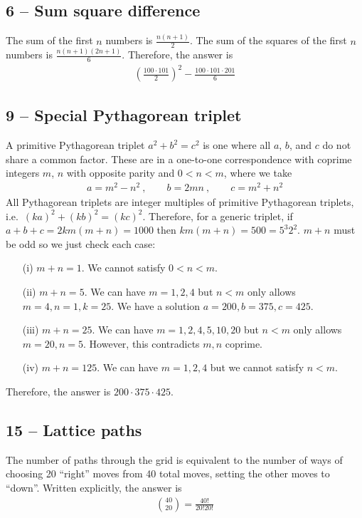 \documentclass{article}
\begin{document}
\subsection*{6 -- Sum square difference}
The sum of the first $n$ numbers is $\frac{n(n+1)}{2}$.
The sum of the squares of the first $n$ numbers is $\frac{n(n+1)(2n+1)}{6}$.
Therefore, the answer is
\begin{align*}
	\boxed{ \left(\frac{100 \cdot 101}{2}\right)^2 -  \frac{100 \cdot 101 \cdot 201}{6} }
\end{align*}


\subsection*{9 -- Special Pythagorean triplet}
A primitive Pythagorean triplet $a^2 + b^2 = c^2$ is one where all $a$, $b$, and $c$ do not share a common factor.
These are in a one-to-one correspondence with coprime integers $m$, $n$ with opposite parity and $0 < n < m$, where we take
\begin{align*}
	a = m^2 - n^2 ~, \qquad b = 2mn ~, \qquad c = m^2+n^2
\end{align*}
All Pythagorean triplets are integer multiples of primitive Pythagorean triplets, i.e.~$(ka)^2 + (kb)^2 = (kc)^2$.
Therefore, for a generic triplet, if $a+b+c = 2km(m+n) = 1000$ then $km(m+n) = 500 = 5^3 2^2$.
$m+n$ must be odd so we just check each case:
\begin{itemize}
	\item[(i)] $m+n = 1$. We cannot satisfy $0 < n < m$.
	\item[(ii)] $m+n = 5$. We can have $m = 1, 2, 4$ but $n < m$ only allows $m = 4, n = 1, k = 25$. We have a solution $a = 200, b = 375, c = 425$.
	\item[(iii)] $m+n = 25$. We can have $m = 1, 2, 4, 5, 10, 20$ but $n < m$ only allows $m = 20, n = 5$. However, this contradicts $m,n$ coprime.
	\item[(iv)] $m+n=125$. We can have $m = 1, 2, 4$ but we cannot satisfy $n < m$.
\end{itemize}
Therefore, the answer is $\boxed{ 200 \cdot 375 \cdot 425 }$.


\subsection*{15 -- Lattice paths}
The number of paths through the grid is equivalent to the number of ways of choosing 20 ``right'' moves from 40 total moves, setting the other moves to ``down''.
Written explicitly, the answer is
\begin{align*}
	\boxed{ \binom{40}{20} = \frac{40!}{20!  20!} }
\end{align*}
\end{document}
